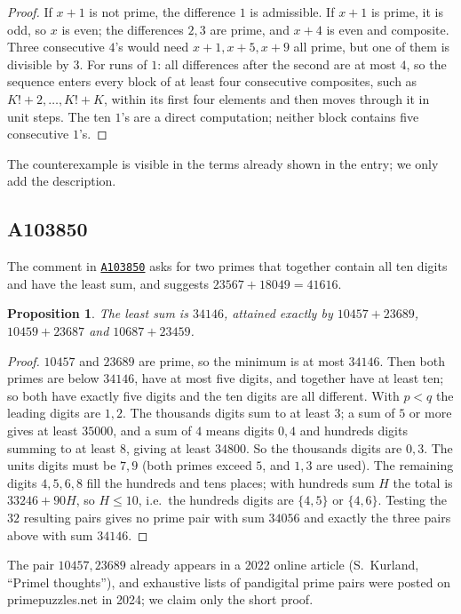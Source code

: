 \documentclass[11pt,a4paper]{article}
\newtheorem{proposition}[theorem]{Proposition}
\theoremstyle{remark}
\newcommand{\oeis}[1]{\href{https://oeis.org/#1}{\texttt{#1}}}
\begin{document}
\begin{proof}
If $x+1$ is not prime, the difference $1$ is admissible. If $x+1$ is prime, it is odd, so $x$ is even; the differences $2,3$ are prime, and $x+4$ is even and composite. Three consecutive $4$'s would need $x+1,x+5,x+9$ all prime, but one of them is divisible by $3$. For runs of $1$: all differences after the second are at most $4$, so the sequence enters every block of at least four consecutive composites, such as $K!+2,\dots,K!+K$, within its first four elements and then moves through it in unit steps. The ten $1$'s are a direct computation; neither block contains five consecutive $1$'s.
\end{proof}

The counterexample is visible in the terms already shown in the entry; we only add the description.

\subsection{A103850}

The comment in \oeis{A103850} asks for two primes that together contain all ten digits and have the least sum, and suggests $23567+18049=41616$.

\begin{proposition}
The least sum is $34146$, attained exactly by $10457+23689$, $10459+23687$ and $10687+23459$.
\end{proposition}

\begin{proof}
$10457$ and $23689$ are prime, so the minimum is at most $34146$. Then both primes are below $34146$, have at most five digits, and together have at least ten; so both have exactly five digits and the ten digits are all different. With $p<q$ the leading digits are $1,2$. The thousands digits sum to at least $3$; a sum of $5$ or more gives at least $35000$, and a sum of $4$ means digits $0,4$ and hundreds digits summing to at least $8$, giving at least $34800$. So the thousands digits are $0,3$. The units digits must be $7,9$ (both primes exceed $5$, and $1,3$ are used). The remaining digits $4,5,6,8$ fill the hundreds and tens places; with hundreds sum $H$ the total is $33246+90H$, so $H\le10$, i.e.\ the hundreds digits are $\{4,5\}$ or $\{4,6\}$. Testing the $32$ resulting pairs gives no prime pair with sum $34056$ and exactly the three pairs above with sum $34146$.
\end{proof}

The pair $10457,23689$ already appears in a 2022 online article (S.~Kurland, ``Primel thoughts''), and exhaustive lists of pandigital prime pairs were posted on primepuzzles.net in 2024; we claim only the short proof.
\end{document}
